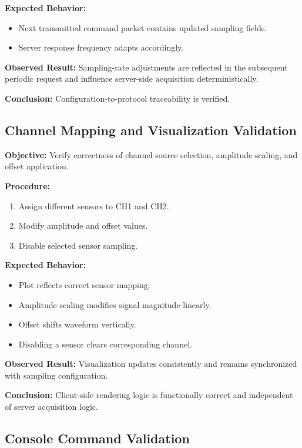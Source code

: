 \textbf{Expected Behavior:}
\begin{itemize}
	\item Next transmitted command packet contains updated sampling fields.
	\item Server response frequency adapts accordingly.
\end{itemize}

\textbf{Observed Result:}  
Sampling-rate adjustments are reflected in the subsequent periodic request and influence server-side acquisition deterministically.

\textbf{Conclusion:}  
Configuration-to-protocol traceability is verified.

\subsection{Channel Mapping and Visualization Validation}
\label{sec:gui_validation_channels}

\textbf{Objective:}  
Verify correctness of channel source selection, amplitude scaling, and offset application.

\textbf{Procedure:}
\begin{enumerate}
	\item Assign different sensors to CH1 and CH2.
	\item Modify amplitude and offset values.
	\item Disable selected sensor sampling.
\end{enumerate}

\textbf{Expected Behavior:}
\begin{itemize}
	\item Plot reflects correct sensor mapping.
	\item Amplitude scaling modifies signal magnitude linearly.
	\item Offset shifts waveform vertically.
	\item Disabling a sensor clears corresponding channel.
\end{itemize}

\textbf{Observed Result:}  
Visualization updates consistently and remains synchronized with sampling configuration.

\textbf{Conclusion:}  
Client-side rendering logic is functionally correct and independent of server acquisition logic.

\subsection{Console Command Validation}
\label{sec:gui_validation_console}


